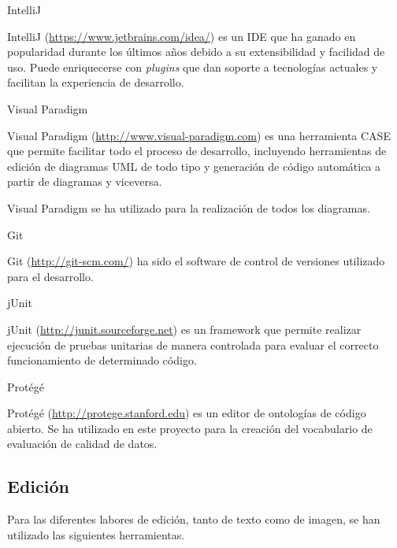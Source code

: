 \begin{definitionlist} 
\item[IntelliJ]

IntelliJ (\url{https://www.jetbrains.com/idea/}) es un \acf{IDE} que ha ganado
en popularidad durante los últimos años debido a su extensibilidad y facilidad
de uso. Puede enriquecerse con \textit{plugins} que dan soporte a tecnologías
actuales y facilitan la experiencia de desarrollo. 


\item[Visual Paradigm]

Visual Paradigm (\url{http://www.visual-paradigm.com}) es una herramienta
\acf{CASE} que permite facilitar todo el proceso de desarrollo, incluyendo
herramientas de edición de diagramas \acs{UML} de todo tipo y generación de
código automática a partir de diagramas y viceversa. 

Visual Paradigm se ha utilizado para la realización de todos los diagramas. 

\item[Git]

Git (\url{http://git-scm.com/}) ha sido el software de control de versiones
utilizado para el desarrollo. 

\item[jUnit]

jUnit (\url{http://junit.sourceforge.net}) es un framework que permite realizar
ejecución de pruebas unitarias de manera controlada para evaluar el correcto
funcionamiento de determinado código. 

\item[Protégé]

Protégé (\url{http://protege.stanford.edu}) es un editor de ontologías de código
abierto. Se ha utilizado en este proyecto para la creación del vocabulario de
evaluación de calidad de datos. 

\end{definitionlist}


\subsection{Edición}

Para las diferentes labores de edición, tanto de texto como de imagen, se han
utilizado las siguientes herramientas. 

